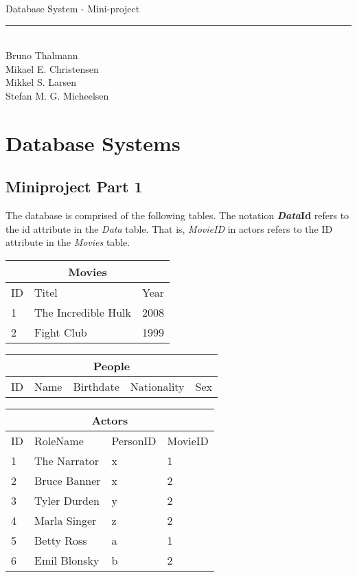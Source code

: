 
\newcommand{\HRule}{\rule{\linewidth}{0.5mm}}


\begin{titlepage}
\centering
{\LARGE Database System - Mini-project}
\HRule \\[0.5cm]
Bruno Thalmann\\
			Mikael E. Christensen\\
			Mikkel S. Larsen\\
			Stefan M. G. Micheelsen
\end{titlepage}

\chapter*{Database Systems}

\section{Miniproject Part 1}
The database is comprised of the following tables.
The notation \textbf{\textit{Data}Id} refers to the id attribute in the \textit{Data} table.
That is, \textit{MovieID} in actors refers to the ID attribute in the \textit{Movies} table.

\noindent\begin{tabular}{|l|l|l|}
\hline
\multicolumn{3}{|c|}{Movies} \\ \hline
ID & Titel & Year \\ \hline
1 & The Incredible Hulk & 2008 \\ \hline
2 & Fight Club & 1999 \\ \hline
\end{tabular}

\noindent\begin{tabular}{|l|l|l|l|l|}
\hline
\multicolumn{5}{|c|}{People} \\ \hline
ID & Name & Birthdate & Nationality & Sex \\ \hline
\end{tabular}

\noindent\begin{tabular}{|l|l|l|l|}
\hline
\multicolumn{4}{|c|}{Actors} \\ \hline
ID & RoleName & PersonID & MovieID \\ \hline
1 & The Narrator & x & 1 \\ \hline
2 & Bruce Banner & x & 2 \\ \hline
3 & Tyler Durden & y & 2 \\ \hline
4 & Marla Singer & z & 2 \\ \hline
5 & Betty Ross & a & 1 \\ \hline
6 & Emil Blonsky & b & 2 \\\hline 
\end{tabular}

